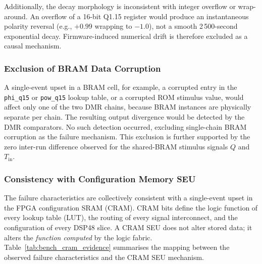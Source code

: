 Additionally, the decay morphology is inconsistent with integer overflow
or wrap-around.  An overflow of a 16-bit Q1.15 register would produce an
instantaneous polarity reversal (e.g., $+0.99$ wrapping to $-1.0$), not
a smooth 2\,500-second exponential decay.  Firmware-induced numerical
drift is therefore excluded as a causal mechanism.

\subsubsection{Exclusion of BRAM Data Corruption}

A single-event upset in a BRAM cell, for example, a corrupted entry in
the \texttt{phi\_q15} or \texttt{pow\_q15} lookup table, or a corrupted
ROM stimulus value, would affect only one of the two DMR chains, because
BRAM instances are physically separate per chain.  The resulting output
divergence would be detected by the DMR comparators.  No such detection
occurred, excluding single-chain BRAM corruption as the failure
mechanism.  This exclusion is further supported by the zero inter-run
difference observed for the shared-BRAM stimulus signals $Q$ and
$T_\mathrm{in}$.

\subsubsection{Consistency with Configuration Memory SEU}
\label{sssec:bench_cram}

The failure characteristics are collectively consistent with a
single-event upset in the FPGA configuration SRAM (CRAM).  CRAM bits
define the logic function of every lookup table (LUT), the routing of
every signal interconnect, and the configuration of every DSP48 slice.
A CRAM SEU does not alter stored data; it alters the \emph{function
computed} by the logic fabric.  Table~\ref{tab:bench_cram_evidence}
summarises the mapping between the observed failure characteristics and
the CRAM SEU mechanism.

